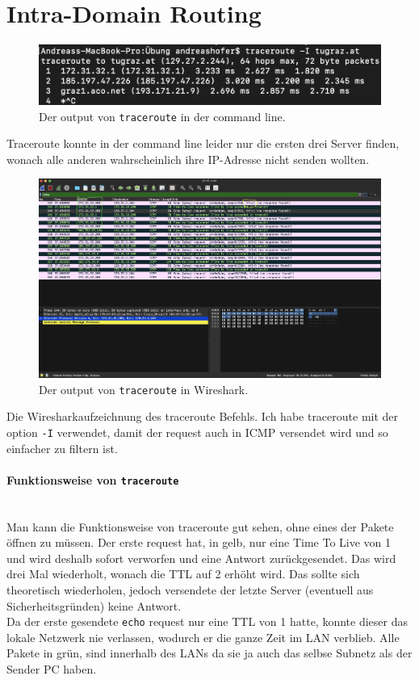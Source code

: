 \documentclass{article}
\newcommand{\paragraphlb}[1]{\paragraph{#1}\mbox{}\\}
\begin{document}
	\section{Intra-Domain Routing}
	\begin{figure}[H]
	\centering
	\includegraphics[scale=0.6]{Bilder/trcrt_com.png}
	\cprotect\caption{Der output von \verb|traceroute| in der command line.}
	\end{figure}
	Traceroute konnte in der command line leider nur die ersten drei Server finden, wonach alle anderen wahrscheinlich ihre IP-Adresse nicht senden wollten.
	\begin{figure}[H]
	\centering
	\includegraphics[scale=0.25]{Bilder/trcrt_wir.png}
	\cprotect\caption{Der output von \verb|traceroute| in Wireshark.}
	\end{figure}
	Die Wiresharkaufzeichnung des traceroute Befehls. Ich habe traceroute mit der option \verb|-I| verwendet, damit der request auch in ICMP versendet wird und so einfacher zu filtern ist. 
	\cprotect\paragraphlb{Funktionsweise von \verb|traceroute|}
	Man kann die Funktionsweise von traceroute gut sehen, ohne eines der Pakete öffnen zu müssen. Der erste request hat, in gelb, nur eine Time To Live von 1 und wird deshalb sofort verworfen und eine Antwort zurückgesendet. Das wird drei Mal wiederholt, wonach die TTL auf 2 erhöht wird. Das sollte sich theoretisch wiederholen, jedoch versendete der letzte Server (eventuell aus Sicherheitsgründen) keine Antwort. \\
	Da der erste gesendete \verb|echo| request nur eine TTL von 1 hatte, konnte dieser das lokale Netzwerk nie verlassen, wodurch er die ganze Zeit im LAN verblieb. Alle Pakete in grün, sind innerhalb des LANs da sie ja auch das selbse Subnetz als der Sender PC haben.
	
	
	
\end{document}
